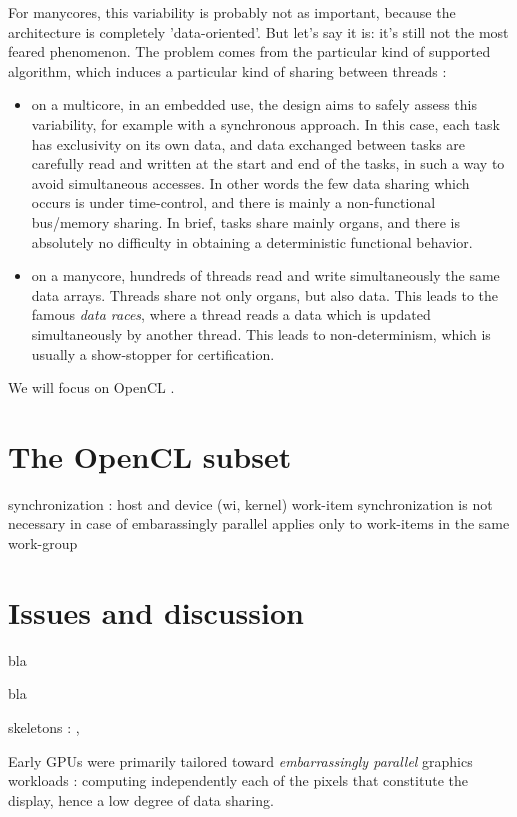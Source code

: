 \documentclass[a4paper,10pt]{article} %
\begin{document}
For manycores, this variability is probably not as important, because the architecture is completely 'data-oriented'.
But let's say it is: it's still not the most feared phenomenon.
The problem comes from the particular kind of supported algorithm, which induces a particular kind of sharing between threads :
\begin{itemize}
\item on a multicore, in an embedded use, the design aims to safely assess this variability, for example with a synchronous approach.
In this case, each task has exclusivity on its own data, and data exchanged between tasks are carefully read and written at the start and end of the tasks, in such a way to avoid simultaneous accesses.
In other words the few data sharing which occurs is under time-control, and there is mainly a non-functional bus/memory sharing.
In brief, tasks share mainly organs, and there is absolutely no difficulty in obtaining a deterministic functional behavior.
\item on a manycore, hundreds of threads read and write simultaneously the same data arrays. Threads share not only organs, but also data. This leads to the famous \emph{data races}, where a thread reads a data which is updated simultaneously by another thread. This leads to non-determinism, which is usually a show-stopper for certification.
\end{itemize}

We will focus on OpenCL \cite{munshi2011opencl}.


\section{The OpenCL subset}


synchronization : host and device (wi, kernel)
work-item synchronization is not necessary in case of embarassingly parallel
applies only to work-items in the same work-group

\section{Issues and discussion}

bla

bla

skeletons : \cite{cole2004bringing}, \cite{steuwer2011skelc}

\cite{betts2012gpuverify}

Early GPUs were primarily tailored toward \emph{embarrassingly parallel} graphics workloads :
computing independently each of the pixels that constitute the display, hence a low degree of data sharing.
\end{document}
